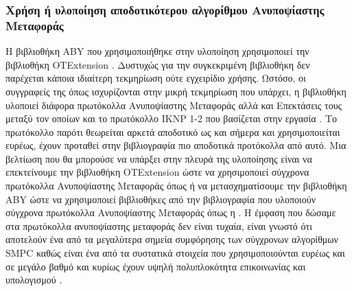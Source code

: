 \subsubsection{Χρήση ή υλοποίηση αποδοτικότερου αλγορίθμου Ανυποψίαστης Μεταφοράς}
Η βιβλιοθήκη ABY που χρησιμοποιήθηκε στην υλοποίηση χρησιμοποιεί την βιβλιοθήκη OTExtension \cite{OTExtensions}. Δυστυχώς για την συγκεκριμένη βιβλιοθήκη δεν παρέχεται κάποια ιδιαίτερη τεκμηρίωση ούτε εγχειρίδιο χρήσης. Ωστόσο, οι συγγραφείς της όπως ισχυρίζονται στην μικρή τεκμηρίωση που υπάρχει, η βιβλιοθήκη υλοποιεί διάφορα πρωτόκολλα Ανυποψίαστης Μεταφοράς αλλά και Επεκτάσεις τους μεταξύ τον οποίων και το πρωτόκολλο IKNP 1-2 που βασίζεται στην εργασία \cite{ishai2003extending}. Το πρωτόκολλο παρότι θεωρείται αρκετά αποδοτικό ως και σήμερα και χρησιμοποιείται ευρέως, έχουν προταθεί στην βιβλιογραφία πιο αποδοτικά προτόκολλα από αυτό. Μια βελτίωση που θα μπορούσε να υπάρξει στην πλευρά της υλοποίησης είναι να επεκτείνουμε την βιβλιοθήκη OTExtension ώστε να χρησιμοποιεί σύγχρονα πρωτόκολλα Ανυποψίαστης Μεταφοράς όπως  ή να μετασχηματίσουμε την βιβλιοθήκη ABY ώστε να χρησιμοποιεί βιβλιοθήκες από την βιβλιογραφία που υλοποιούν σύγχρονα πρωτόκολλα Ανυποψίαστης Μεταφοράς όπως η \cite{libOTe}. H έμφαση που δώσαμε στα πρωτόκολλα ανυποψίαστης μεταφοράς δεν είναι τυχαία, είναι γνωστό ότι αποτελούν ένα από τα μεγαλύτερα σημεία συμφόρησης των σύγχρονων αλγορίθμων SMPC καθώς είναι ένα από τα  συστατικά στοιχεία που χρησιμοποιούνται ευρέως και σε μεγάλο βαθμό και κυρίως έχουν υψηλή πολυπλοκότητα επικοινωνίας και υπολογισμού .